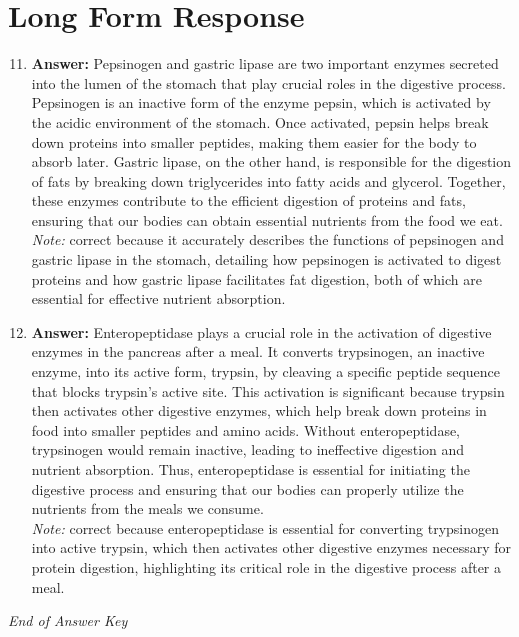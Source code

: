 \documentclass[12pt]{article}
\begin{document}
\section*{Long Form Response}
\begin{enumerate}[label=\arabic*.]
\setcounter{enumi}{10}
\item \textbf{Answer:} Pepsinogen and gastric lipase are two important enzymes secreted into the lumen of the stomach that play crucial roles in the digestive process. Pepsinogen is an inactive form of the enzyme pepsin, which is activated by the acidic environment of the stomach. Once activated, pepsin helps break down proteins into smaller peptides, making them easier for the body to absorb later. Gastric lipase, on the other hand, is responsible for the digestion of fats by breaking down triglycerides into fatty acids and glycerol. Together, these enzymes contribute to the efficient digestion of proteins and fats, ensuring that our bodies can obtain essential nutrients from the food we eat.
\\ \textit{Note:} correct because it accurately describes the functions of pepsinogen and gastric lipase in the stomach, detailing how pepsinogen is activated to digest proteins and how gastric lipase facilitates fat digestion, both of which are essential for effective nutrient absorption.
\item \textbf{Answer:} Enteropeptidase plays a crucial role in the activation of digestive enzymes in the pancreas after a meal. It converts trypsinogen, an inactive enzyme, into its active form, trypsin, by cleaving a specific peptide sequence that blocks trypsin's active site. This activation is significant because trypsin then activates other digestive enzymes, which help break down proteins in food into smaller peptides and amino acids. Without enteropeptidase, trypsinogen would remain inactive, leading to ineffective digestion and nutrient absorption. Thus, enteropeptidase is essential for initiating the digestive process and ensuring that our bodies can properly utilize the nutrients from the meals we consume.
\\ \textit{Note:} correct because enteropeptidase is essential for converting trypsinogen into active trypsin, which then activates other digestive enzymes necessary for protein digestion, highlighting its critical role in the digestive process after a meal.
\end{enumerate}

\vfill
\noindent\textit{End of Answer Key}
\end{document}
